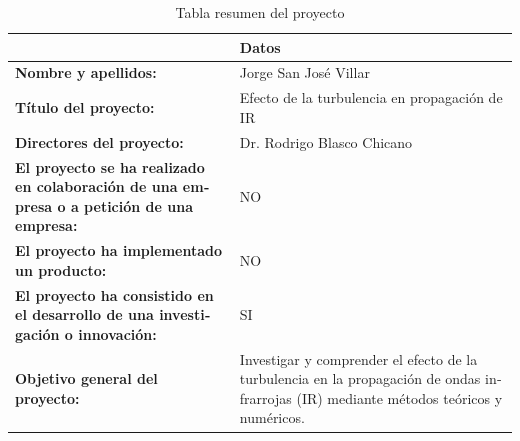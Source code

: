 \begin{otherlanguage}{spanish}
\begin{table}[h]
    \centering
    \begin{tabularx}{1.0\textwidth} { | >{\centering\arraybackslash}X | >{\centering\arraybackslash}X | }
        \hline
         & \textbf{Datos} \\
        \hline
        \textbf{Nombre y apellidos:} & Jorge San José Villar \\
        \hline
        \textbf{Título del proyecto:} & Efecto de la turbulencia en propagación de IR \\
        \hline
        \textbf{Directores del proyecto:} & Dr. Rodrigo Blasco Chicano\\
        \hline
        \textbf{El proyecto se ha realizado en colaboración de una empresa o a petición de una empresa:} & NO \\
        \hline
        \textbf{El proyecto ha implementado un producto:} & NO \\
        \hline
        \textbf{El proyecto ha consistido en el desarrollo de una investigación o innovación:} & SI \\
        \hline
        \textbf{Objetivo general del proyecto:} & Investigar y comprender el efecto de la turbulencia en la propagación de ondas infrarrojas (IR) mediante métodos teóricos y numéricos.\\
        \hline
    \end{tabularx}
    \caption{Tabla resumen del proyecto}
    \label{tab:tabla_resumen}
\end{table}
\end{otherlanguage}


\newpage

\renewcommand*\contentsname{Índice}
\tableofcontents %
\newpage

\begin{otherlanguage}{spanish}
    \listoffigures
\end{otherlanguage}

\newpage

\begin{otherlanguage}{spanish}
    \listoftables
\end{otherlanguage}